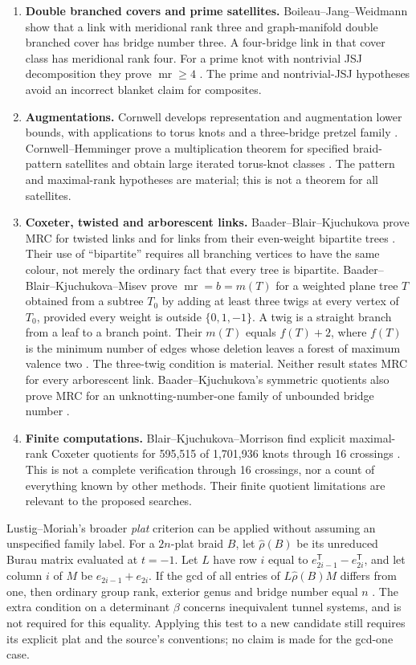 \documentclass[11pt]{article}
\newcommand{\mr}{\operatorname{mr}}
\begin{document}
\begin{enumerate}
\item \textbf{Double branched covers and prime satellites.}
Boileau--Jang--Weidmann show that a link with meridional rank three and
graph-manifold double branched cover has bridge number three. A
four-bridge link in that cover class has meridional rank four.
For a prime knot with nontrivial JSJ decomposition they prove
$\mr\ge4$ \cite{bjw}. The prime and nontrivial-JSJ hypotheses avoid an
incorrect blanket claim for composites.

\item \textbf{Augmentations.} Cornwell develops representation and
augmentation lower bounds, with applications to torus knots and a
three-bridge pretzel family \cite{cornwell}. Cornwell--Hemminger prove a
multiplication theorem for specified braid-pattern satellites and obtain
large iterated torus-knot classes \cite{ch}. The pattern and maximal-rank
hypotheses are material; this is not a theorem for all satellites.

\item \textbf{Coxeter, twisted and arborescent links.}
Baader--Blair--Kjuchukova prove MRC for twisted links and for links from
their even-weight bipartite trees \cite{bbk}. Their use of ``bipartite''
requires all branching vertices to have the same colour, not merely
the ordinary fact that every tree is bipartite.
Baader--Blair--Kjuchukova--Misev prove $\mr=b=m(T)$ for a weighted plane
tree $T$ obtained from a subtree $T_0$ by adding at least three twigs
at every vertex of $T_0$, provided every weight is outside
$\{0,1,-1\}$. A twig is a straight branch from a leaf to a branch
point. Their $m(T)$ equals $f(T)+2$, where $f(T)$ is the minimum
number of edges whose deletion leaves a forest of maximum valence two
\cite[Theorems 1 and 2]{twigs}. The three-twig condition is material.
Neither result states MRC for every arborescent link.
Baader--Kjuchukova's symmetric quotients also prove MRC for an
unknotting-number-one family of unbounded bridge number \cite{bk}.

\item \textbf{Finite computations.} Blair--Kjuchukova--Morrison find
explicit maximal-rank Coxeter quotients for 595,515 of 1,701,936 knots
through 16 crossings \cite{bkm}. This is not a complete verification
through 16 crossings, nor a count of everything known by other methods.
Their finite quotient limitations are relevant to the proposed searches.
\end{enumerate}

Lustig--Moriah's broader \emph{plat} criterion can be applied without
assuming an unspecified family label. For a $2n$-plat braid $B$, let
$\widehat\rho(B)$ be its unreduced Burau matrix evaluated at $t=-1$.
Let $L$ have row $i$ equal to $e_{2i-1}^{\mathsf T}-e_{2i}^{\mathsf T}$,
and let column $i$ of $M$ be $e_{2i-1}+e_{2i}$. If the gcd of all
entries of $L\widehat\rho(B)M$ differs from one, then ordinary group
rank, exterior genus and bridge number equal $n$ \cite[Theorem 4.20]{moriah}.
The extra condition on a determinant $\beta$ concerns inequivalent
tunnel systems, and is not required for this equality. Applying this
test to a new candidate still requires its explicit plat and the
source's conventions; no claim is made for the gcd-one case.
\end{document}
